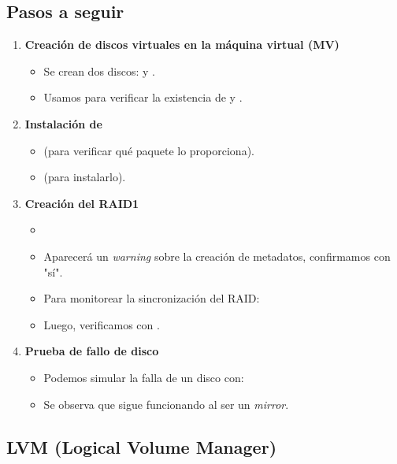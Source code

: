 \subsection{Pasos a seguir}
\begin{enumerate}
    \item \textbf{Creación de discos virtuales en la máquina virtual (MV)}
    \begin{itemize}
        \item Se crean dos discos:  y .
        \item Usamos  para verificar la existencia de  y .
    \end{itemize}

    \item \textbf{Instalación de }
    \begin{itemize}
        \item {} (para verificar qué paquete lo proporciona).
        \item {} (para instalarlo).
    \end{itemize}

    \item \textbf{Creación del RAID1}
    \begin{itemize}
        \item {}
        \item Aparecerá un \textit{warning} sobre la creación de metadatos, confirmamos con "sí".
        \item Para monitorear la sincronización del RAID:  
        \item Luego, verificamos con .
    \end{itemize}

    \item \textbf{Prueba de fallo de disco}
    \begin{itemize}
        \item Podemos simular la falla de un disco con:  
        \item Se observa que  sigue funcionando al ser un \textit{mirror}.
    \end{itemize}
\end{enumerate}

\subsection{LVM (Logical Volume Manager)}

